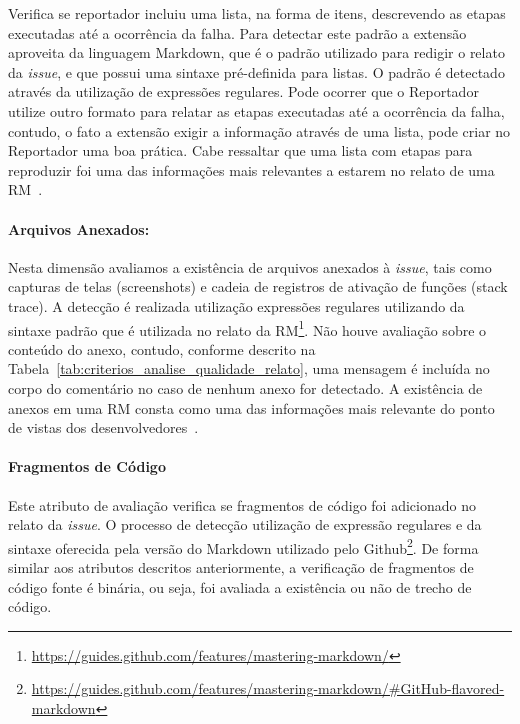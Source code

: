 Verifica se reportador incluiu uma lista, na forma de itens, descrevendo as
etapas executadas até a ocorrência da falha. Para detectar este padrão a
extensão aproveita da linguagem Markdown, que é o padrão utilizado para redigir
o relato da \textit{issue}, e que possui uma sintaxe pré-definida para listas. O
padrão é detectado através da utilização de expressões regulares. Pode ocorrer
que o Reportador utilize outro formato para relatar as etapas executadas até a
ocorrência da falha, contudo, o fato a extensão exigir a informação através de
uma lista, pode criar no Reportador uma boa prática. Cabe ressaltar que uma
lista com etapas para reproduzir foi uma das informações mais relevantes a
estarem no relato de uma RM~\cite{bettenburg2008makes}.

\paragraph{Arquivos Anexados:}
\label{par:arquivos_anexados}

Nesta dimensão avaliamos a existência de arquivos anexados à \textit{issue},
tais como capturas de telas (screenshots) e cadeia de registros de ativação de
funções (stack trace). A detecção é realizada utilização expressões regulares
utilizando da sintaxe padrão que é utilizada no relato da
RM\footnote{\url{https://guides.github.com/features/mastering-markdown/}}. Não
houve avaliação sobre o conteúdo do anexo, contudo, conforme descrito na
Tabela~\ref{tab:criterios_analise_qualidade_relato}, uma mensagem é incluída no
corpo do comentário no caso de nenhum anexo for detectado. A existência de
anexos em uma RM consta como uma das informações mais relevante do ponto de
vistas dos desenvolvedores~\cite{bettenburg2008makes}.

\paragraph{Fragmentos de Código}
\label{par:fragmentos_de_código}

Este atributo de avaliação verifica se fragmentos de código foi adicionado no
relato da \textit{issue}. O processo de detecção utilização de expressão
regulares e da sintaxe oferecida pela versão do Markdown utilizado pelo
Github\footnote{\url{https://guides.github.com/features/mastering-markdown/\#GitHub-flavored-markdown}}.
De forma similar aos atributos descritos anteriormente, a verificação de
fragmentos de código fonte é binária, ou seja, foi avaliada a existência ou não
de trecho de código.

